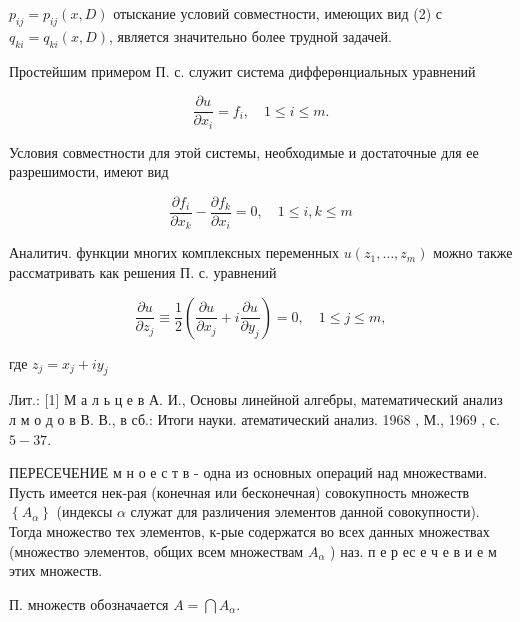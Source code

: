 \documentclass[10pt]{article}
\begin{document}
$p_{i j}=p_{i j}(x, D)$ отыскание условий совместности, имеющих вид (2) с $q_{k i}=q_{k i}(x, D)$, является значительно более трудной задачей.



Простейшим примером П. с. служит система дифферөнциальных уравнений



\[

\frac{\partial u}{\partial x_{i}}=f_{i}, \quad 1 \leqslant i \leqslant m .

\]



Условия совместности для этой системы, необходимые и достаточные для ее разрешимости, имеют вид



\[

\frac{\partial f_{i}}{\partial x_{k}}-\frac{\partial f_{k}}{\partial x_{i}}=0, \quad 1 \leqslant i, k \leqslant m

\]



Аналитич. функции многих комплексных переменных $u\left(z_{1}, \ldots, z_{m}\right)$ можно также рассматривать как решения П. с. уравнений



\[

\frac{\partial u}{\partial z_{j}} \equiv \frac{1}{2}\left(\frac{\partial u}{\partial x_{j}}+i \frac{\partial u}{\partial y_{j}}\right)=0, \quad 1 \leqslant j \leqslant m,

\]



где $z_{j}=x_{j}+i y_{j}$



Лит.: [1] М а л ь ц е в А. И., Основы линейной алгебры, математический анализ л м о д о в В. В., в сб.: Итоги науки. атематический анализ. 1968 , М., 1969 , с. $5-37$.



ПЕРЕСЕЧЕНИЕ м н о е с т в - одна из основных операций над множествами. Пусть имеется нек-рая (конечная или бесконечная) совокупность множеств $\left\{A_{\alpha}\right\}$ (индексы $\alpha$ служат для различения элементов данной совокупности). Тогда множество тех элементов, к-рые содержатся во всех данных множествах (множество элементов, общих всем множествам $A_{\alpha}$ ) наз. п е р ес е ч е в и е м этих множеств.



П. множеств обозначается $A=\bigcap A_{\alpha}$.
\end{document}
